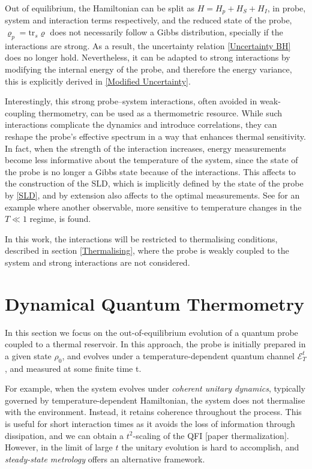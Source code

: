 Out of equilibrium, the Hamiltonian can be split as $H = H_p +  H_S +  H_I$, in probe, system and interaction terms respectively, and the reduced state of the probe, $ \varrho_p = \text{tr}_s \varrho$ does not necessarily follow a Gibbs distribution, specially if the interactions are strong. As a result, the uncertainty relation \eqref{Uncertainty BH} does no longer hold. Nevertheless, it can be adapted to strong interactions by modifying the internal energy of the probe, and therefore the energy variance, this is explicitly derived in \ref{Modified Uncertainty}.

Interestingly, this strong probe–system interactions, often avoided in weak-coupling thermometry, can be used as a thermometric resource. While such interactions complicate the dynamics and introduce correlations, they can reshape the probe's effective spectrum in a way that enhances thermal sensitivity. In fact, when the strength of the interaction increases, energy measurements become less informative about the temperature of the system, since the state of the probe is no longer a Gibbs state because of the interactions.  This affects to the construction of the SLD, which is implicitly defined by the state of the probe by \eqref{SLD}, and by extension also affects to the optimal measurements. See \cite{Correa2015} for an example where another observable, more sensitive to temperature changes in the $T\ll 1$ regime, is found.

In this work, the interactions will be restricted to thermalising conditions, described in section \ref{Thermalising}, where the probe is weakly coupled to the system and strong interactions are not considered.

\section{Dynamical Quantum Thermometry}\label{Dynamical Thermometry}

In this section we focus on the out-of-equilibrium evolution of a quantum probe coupled to a thermal reservoir. In this approach, the probe is initially prepared in a given state \(\rho_0 \), and evolves under a temperature-dependent quantum channel $\mathcal{E}_T^t$, and measured at some finite time t.

For example, when the system evolves under \textit{coherent unitary dynamics}, typically governed by temperature-dependent Hamiltonian, the system does not thermalise with the environment. Instead, it retains coherence throughout the process. This is useful for short interaction times as it avoids the loss of information through dissipation, and we can obtain a $t^2$-scaling of the QFI [paper thermalization]. However, in the limit of large $t$ the unitary evolution is hard to accomplish, and \textit{steady-state metrology} offers an alternative framework.

